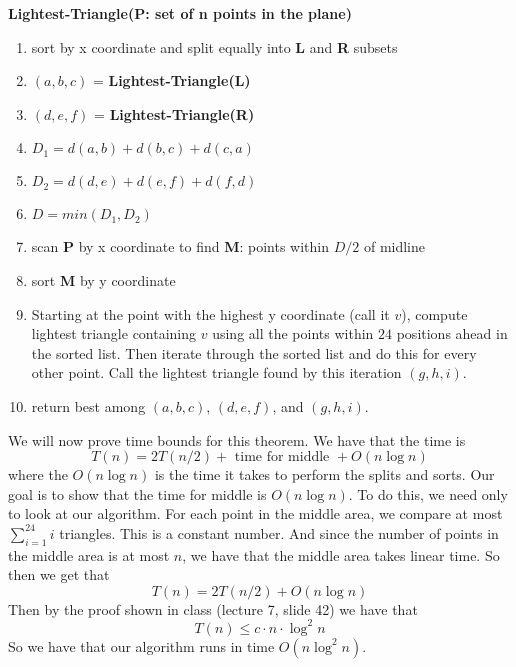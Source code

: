 \documentclass{article}
\begin{document}
\vspace{5mm}
\noindent \textbf{Lightest-Triangle(P: set of n points in the plane)}
\begin{enumerate}
    \item sort by x coordinate and split equally into \textbf{L} and \textbf{R} subsets
    \item $(a,b,c)$ = \textbf{Lightest-Triangle(L)}
    \item $(d,e,f)$ = \textbf{Lightest-Triangle(R)}
    \item $D_1 = d(a,b) + d(b,c) + d(c,a)$
    \item $D_2 = d(d,e) + d(e,f) + d(f,d)$
    \item $D = min(D_1, D_2)$
    \item scan \textbf{P} by x coordinate to find \textbf{M}: points within $D/2$ of midline
    \item sort \textbf{M} by y coordinate
    \item Starting at the point with the highest y coordinate (call it $v$),
        compute lightest triangle containing $v$ using all the points within
        $24$ positions ahead in the sorted list. Then iterate through the sorted
        list and do this for every other point. Call the lightest triangle found
        by this iteration $(g,h,i)$.
    \item return best among $(a,b,c)$, $(d,e,f)$, and $(g,h,i)$.
\end{enumerate}

\vspace{8mm}
We will now prove time bounds for this theorem. We have that the time is
\[ T(n) = 2T(n/2) + \text{ time for middle } + O(n \log n) \]
where the $O(n \log n)$ is the time it takes to perform the splits and sorts.
Our goal is to show that the time for middle is $O(n \log n)$. To do this,
we need only to look at our algorithm. For each point in the middle area, we
compare at most $\sum_{i=1}^{24} i$ triangles. This is a constant number. And
since the number of points in the middle area is at most $n$, we have that the
middle area takes linear time. So then we get that
\[ T(n) = 2T(n/2) + O(n \log n) \]
Then by the proof shown in class (lecture 7, slide 42) we have that
\[ T(n) \leq c \cdot n \cdot \log^2 n \]
So we have that our algorithm runs in time $O(n \log^2 n)$.
\end{document}
